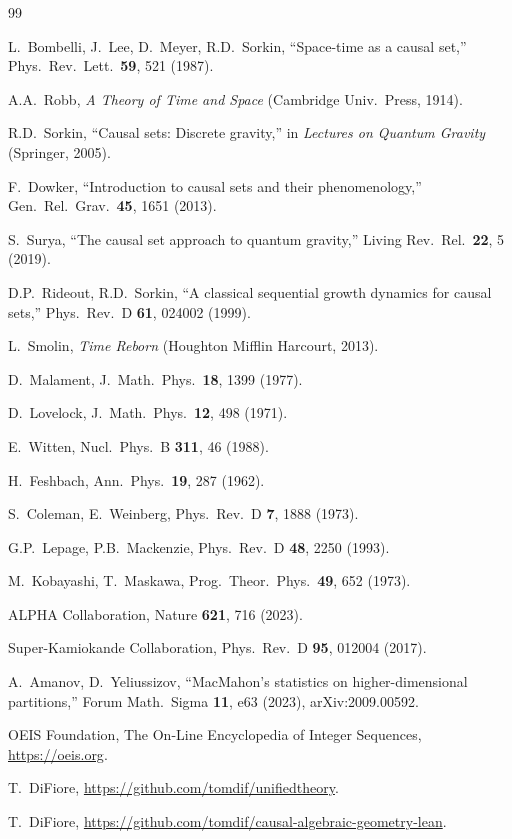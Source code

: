 \documentclass[11pt,letterpaper]{article}
\theoremstyle{remark}
\begin{document}
\begin{thebibliography}{99}

 L.~Bombelli, J.~Lee, D.~Meyer, R.D.~Sorkin,
  ``Space-time as a causal set,''
  Phys.\ Rev.\ Lett.\ \textbf{59}, 521 (1987).

 A.A.~Robb,
  \textit{A Theory of Time and Space} (Cambridge Univ.\ Press, 1914).

 R.D.~Sorkin,
  ``Causal sets: Discrete gravity,'' in
  \textit{Lectures on Quantum Gravity} (Springer, 2005).

 F.~Dowker,
  ``Introduction to causal sets and their phenomenology,''
  Gen.\ Rel.\ Grav.\ \textbf{45}, 1651 (2013).

 S.~Surya,
  ``The causal set approach to quantum gravity,''
  Living Rev.\ Rel.\ \textbf{22}, 5 (2019).

 D.P.~Rideout, R.D.~Sorkin,
  ``A classical sequential growth dynamics for causal sets,''
  Phys.\ Rev.\ D \textbf{61}, 024002 (1999).

 L.~Smolin,
  \textit{Time Reborn} (Houghton Mifflin Harcourt, 2013).

 D.~Malament,
  J.\ Math.\ Phys.\ \textbf{18}, 1399 (1977).

 D.~Lovelock,
  J.\ Math.\ Phys.\ \textbf{12}, 498 (1971).

 E.~Witten,
  Nucl.\ Phys.\ B \textbf{311}, 46 (1988).

 H.~Feshbach,
  Ann.\ Phys.\ \textbf{19}, 287 (1962).

 S.~Coleman, E.~Weinberg,
  Phys.\ Rev.\ D \textbf{7}, 1888 (1973).

 G.P.~Lepage, P.B.~Mackenzie,
  Phys.\ Rev.\ D \textbf{48}, 2250 (1993).

 M.~Kobayashi, T.~Maskawa,
  Prog.\ Theor.\ Phys.\ \textbf{49}, 652 (1973).

 ALPHA Collaboration,
  Nature \textbf{621}, 716 (2023).

 Super-Kamiokande Collaboration,
  Phys.\ Rev.\ D \textbf{95}, 012004 (2017).

 A.~Amanov, D.~Yeliussizov,
  ``MacMahon's statistics on higher-dimensional partitions,''
  Forum Math.\ Sigma \textbf{11}, e63 (2023),
  arXiv:2009.00592.

 OEIS Foundation,
  The On-Line Encyclopedia of Integer Sequences,
  \url{https://oeis.org}.

 T.~DiFiore,
  \url{https://github.com/tomdif/unifiedtheory}.

 T.~DiFiore,
  \url{https://github.com/tomdif/causal-algebraic-geometry-lean}.

\end{thebibliography}
\end{document}
